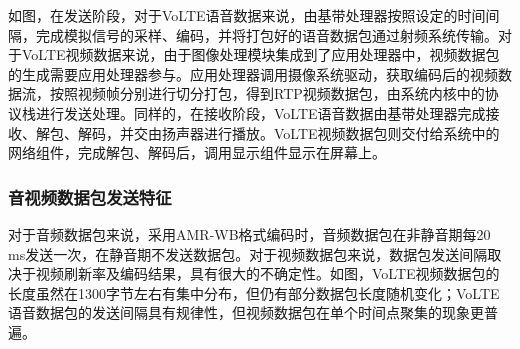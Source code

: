 
如图，在发送阶段，对于VoLTE语音数据来说，由基带处理器按照设定的时间间隔，完成模拟信号的采样、编码，并将打包好的语音数据包通过射频系统传输。对于VoLTE视频数据来说，由于图像处理模块集成到了应用处理器中，视频数据包的生成需要应用处理器参与。应用处理器调用摄像系统驱动，获取编码后的视频数据流，按照视频帧分别进行切分打包，得到RTP视频数据包，由系统内核中的协议栈进行发送处理。同样的，在接收阶段，VoLTE语音数据由基带处理器完成接收、解包、解码，并交由扬声器进行播放。VoLTE视频数据包则交付给系统中的网络组件，完成解包、解码后，调用显示组件显示在屏幕上。

\subsubsection{音视频数据包发送特征}
\label{chap:backinfo:volte:packets:send}
对于音频数据包来说，采用AMR-WB格式编码时，音频数据包在非静音期每20 ms发送一次，在静音期不发送数据包。对于视频数据包来说，数据包发送间隔取决于视频刷新率及编码结果，具有很大的不确定性。如图，VoLTE视频数据包的长度虽然在1300字节左右有集中分布，但仍有部分数据包长度随机变化；VoLTE语音数据包的发送间隔具有规律性，但视频数据包在单个时间点聚集的现象更普遍。


